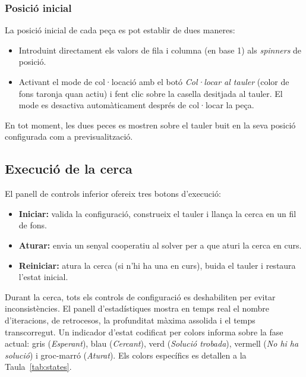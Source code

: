 \documentclass[conference,compsoc]{IEEEtran}
\begin{document}
\subsubsection{Posició inicial}

La posició inicial de cada peça es pot establir de dues maneres:

\begin{itemize}
    \item Introduint directament els valors de fila i columna (en
          base 1) als \textit{spinners} de posició.
    \item Activant el mode de col·locació amb el botó
          \textit{Col·locar al tauler} (color de fons taronja quan
          actiu) i fent clic sobre la casella desitjada al tauler.
          El mode es desactiva automàticament després de col·locar
          la peça.
\end{itemize}

En tot moment, les dues peces es mostren sobre el tauler buit en
la seva posició configurada com a previsualització.

\subsection{Execució de la cerca}

El panell de controls inferior ofereix tres botons d'execució:

\begin{itemize}
    \item \textbf{Iniciar:} valida la configuració, construeix el
          tauler i llança la cerca en un fil de fons.
    \item \textbf{Aturar:} envia un senyal cooperatiu al solver
          per a que aturi la cerca en curs.
    \item \textbf{Reiniciar:} atura la cerca (si n'hi ha una en
          curs), buida el tauler i restaura l'estat inicial.
\end{itemize}

Durant la cerca, tots els controls de configuració es deshabiliten
per evitar inconsistències. El panell d'estadístiques mostra en
temps real el nombre d'iteracions, de retrocesos, la profunditat
màxima assolida i el temps transcorregut. Un indicador d'estat
codificat per colors informa sobre la fase actual:
gris (\textit{Esperant}), blau (\textit{Cercant}),
verd (\textit{Solució trobada}), vermell
(\textit{No hi ha solució}) i groc-marró (\textit{Aturat}).
Els colors específics es detallen a la Taula~\ref{tab:states}.
\end{document}
